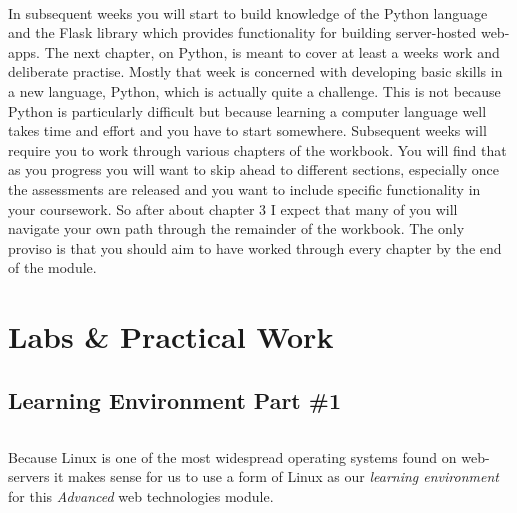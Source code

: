 \documentclass[12pt, a4paper, oneside]{book}
\begin{document}
\paragraph{} In subsequent weeks you will start to build knowledge of the Python language and the Flask library which provides functionality for building server-hosted web-apps. The next chapter, on Python, is meant to cover at least a weeks work and deliberate practise. Mostly that week is concerned with developing basic skills in a new language, Python, which is actually quite a challenge. This is not because Python is particularly difficult but because learning a computer language well takes time and effort and you have to start somewhere. Subsequent weeks will require you to work through various chapters of the workbook. You will find that as you progress you will want to skip ahead to different sections, especially once the assessments are released and you want to include specific functionality in your coursework. So after about chapter 3 I expect that many of you will navigate your own path through the remainder of the workbook. The only proviso is that you should aim to have worked through every chapter by the end of the module.












\part{Labs \& Practical Work}
\chapter{Learning Environment Part \#1}
\label{lab1}
\paragraph{} Because Linux is one of the most widespread operating systems found on web-servers it makes sense for us to use a form of Linux as our \emph{learning environment} for this \emph{Advanced} web technologies module. 
\end{document}
